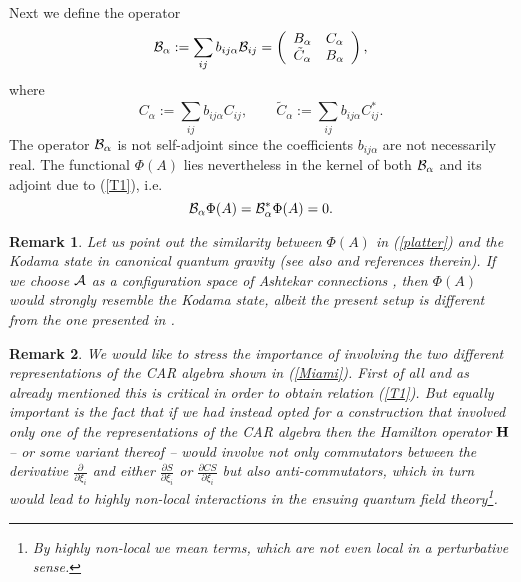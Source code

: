 \documentclass[12pt]{article}
\def\a{\alpha}
\def\ca{{\cal A}}
\def\cb{{\cal B}}
\def\ch{{\cal H}}
\newcommand{\pa}{\partial}
\newtheorem{remark}{Remark}
\begin{document}
Next we define the operator
\begin{eqnarray}
\cb_{\a}:= \sum_{ij} b_{ij\a} \cb_{ij} =   \left(
\begin{array}{cc}
 B_\a  & C_\a \\ 
\tilde{C}_\a    &  B_\a
\end{array}
\right),
\label{BDx22}
\end{eqnarray}
where
$$
C_\a := \sum_{ij} b_{ij\a} C_{ij} ,  \qquad     \tilde{C}_\a  := \sum_{ij} b_{ij\a} C_{ij}^*.
$$
The operator $\cb_\a$ is not self-adjoint since the coefficients $b_{ij\a}$ are not necessarily real. The functional $\Phi(A)$ lies nevertheless in the kernel of both $\cb_\a$ and its adjoint due to (\ref{T1}), i.e. 
$$
\cb_\a \Phi(A) = \cb^*_\a \Phi(A)  =0.
$$



\begin{remark}
Let us point out the similarity between $\Phi(A)$ in (\ref{platter}) and the Kodama state in canonical quantum gravity \cite{Kodama:1988yf} (see also \cite{Smolin:2002sz} and references therein). If we choose $\ca$ as a configuration space of Ashtekar connections \cite{Ashtekar:1986yd,Ashtekar:1987gu}, then $\Phi(A)$ would strongly resemble the Kodama state, albeit the present setup is different from the one presented in \cite{Smolin:2002sz}.
\end{remark}



\begin{remark}
We would like to stress the importance of involving the two different representations of the CAR algebra shown in (\ref{Miami}). First of all and as already mentioned this is critical in order to obtain relation (\ref{T1}). But equally important is the fact that if we had instead opted for a construction that involved only one of the representations of the CAR algebra then the Hamilton operator ${\bf H}$ -- or some variant thereof -- would involve not only commutators between the derivative $\frac{\pa}{\pa\xi_i}$ and either $\frac{\pa S}{\pa\xi_i}$ or $\frac{\pa CS}{\pa\xi_i}$ but also anti-commutators, which in turn would lead to highly non-local interactions in the ensuing quantum field theory\footnote{By highly non-local we mean terms, which are not even local in a perturbative sense.}. 
\end{remark}
\end{document}
